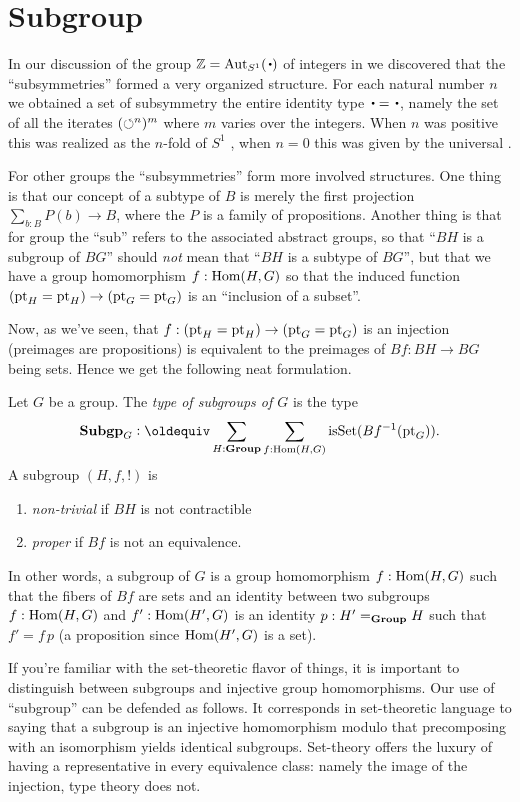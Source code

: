 \section{Subgroup}
\label{sec:subgroups}
In our discussion of the group $\ZZ=\aut_{S^1}(\base)$ of integers in we discovered that the ``subsymmetries'' formed a very organized structure.  For each natural number $n$ we obtained a set of subsymmetry the entire identity type $\base=\base$, namely the set of all the iterates $(\circlearrowleft^{n})^m$ where $m$ varies over the integers.  When $n$ was positive this was realized as the $n$-fold \covering of $S^1$ , when $n=0$ this was given by the universal \covering.  

For other groups the ``subsymmetries'' form more involved structures.  One thing is that our concept of a subtype of $B$ is merely the first projection $\sum_{b:B}P(b)\to B$, where the $P$ is a family of propositions.  Another thing is that for group the ``sub'' refers to the associated abstract groups, so that ``$BH$ is a subgroup of $BG$'' should \emph{not} mean that ``$BH$ is a subtype of $BG$'', but that we have a group homomorphism $f:\mathrm{Hom}(H,G)$ so that the induced function $({\mathord{\mathrm{pt}}}_H={\mathord{\mathrm{pt}}}_H)\to({\mathord{\mathrm{pt}}}_G={\mathord{\mathrm{pt}}}_G)$ is an ``inclusion of a subset''. 

Now, as we've seen, that   $f:({\mathord{\mathrm{pt}}}_H={\mathord{\mathrm{pt}}}_H)\to({\mathord{\mathrm{pt}}}_G={\mathord{\mathrm{pt}}}_G)$ is an injection (preimages are propositions) is equivalent to the preimages of $Bf:BH\to BG$ being sets.  Hence we get the following neat formulation.
\newcommand{\typesubgroup}{\mathbf{Subgp}}
    \begin{definition}
      \label{def:subgroup}
      Let $G$ be a group.  
      The \emph{type of subgroups of $G$} is the type
      $$\typesubgroup_G\defequi\sum_{H:\typegroup}\sum_{f:\Hom(H,G)}\isset(Bf^{-1}(\pt_G)).$$
       A subgroup $(H,f,!)$ is
      \begin{enumerate}
      \item \emph{non-trivial} if $BH$ is not contractible
      \item \emph{proper} if $Bf$ is not an equivalence.
      \end{enumerate}
    \end{definition}
In other words, a subgroup of $G$ is a group homomorphism $f:\mathrm{Hom}(H,G)$ such that the fibers of $Bf$ are sets and an identity between two subgroups $f:\mathrm{Hom}(H,G)$ and $f':\mathrm{Hom}(H',G)$ is an identity $p:H'=_{\mathbf{Group}}H$ such that $f'=f\,p$ (a proposition since $\mathrm{Hom}(H',G)$ is a set).
\begin{remark}
  If you're familiar with the set-theoretic flavor of things, it is important to distinguish between subgroups and injective group homomorphisms.  
Our use of ``subgroup'' can be defended as follows.  It corresponds in set-theoretic language to saying that a subgroup is an injective homomorphism modulo that precomposing with an isomorphism yields identical subgroups.  
Set-theory offers the luxury of having a representative in every equivalence class: namely the image of the injection, type theory does not.
\end{remark}


